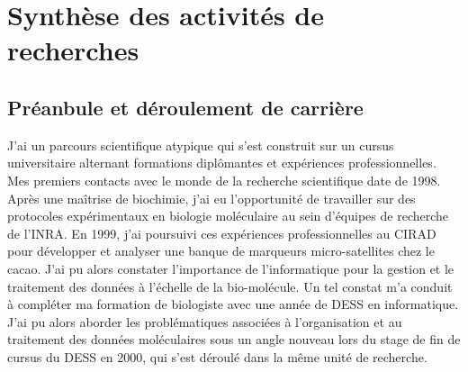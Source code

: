 \chapter{Synthèse des activités de recherches} %

\label{synthese} %

\section{Préanbule et déroulement de carrière}
J’ai un parcours scientifique atypique qui s’est construit sur un cursus universitaire alternant formations diplômantes et expériences professionnelles. Mes premiers contacts avec le monde de la recherche scientifique date de 1998. Après une maîtrise de biochimie, j’ai eu l’opportunité de travailler sur des protocoles expérimentaux en biologie moléculaire au sein d’équipes de recherche de l’INRA. En 1999, j’ai poursuivi ces expériences professionnelles au CIRAD pour développer et analyser une banque de marqueurs micro-satellites chez le cacao. J’ai pu alors constater l’importance de l’informatique pour la gestion et le traitement des données à l’échelle de la bio-molécule. Un tel constat m’a conduit à compléter ma formation de biologiste avec une année de DESS en informatique. J’ai pu alors aborder les problématiques associées à l’organisation et au traitement des données moléculaires sous un angle nouveau lors du stage de fin de cursus du DESS en 2000, qui s’est déroulé dans la même unité de recherche. \\

